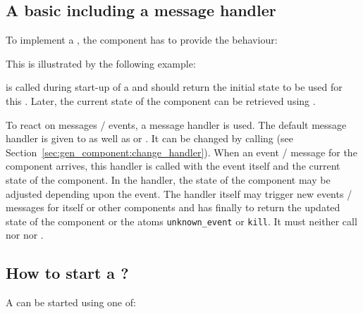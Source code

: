 \subsection{\texorpdfstring{A basic  including a message handler}
             {A basic gen\_component including a message handler}}

To implement a , the component has to provide the
 behaviour:


This is illustrated by the following example:


 is called during start-up of a
 and should return the initial state to be used
for this . Later, the current state of the
component can be retrieved using .

To react on messages / events, a message handler is used. The default
message handler is given to
 as well as
 or
. It can be
changed by calling  (see
Section~\ref{sec:gen_component:change_handler}). When an event / message for
the component arrives, this handler is called with the event itself and the
current state of the component. In the handler, the state of the component
may be adjusted depending upon the event. The handler itself may trigger new
events / messages for itself or other components and has finally to return
the updated state of the component or the atoms \texttt{unknown\_event} or
\texttt{kill}. It must neither call  nor
 nor .

\subsection{\texorpdfstring{How to start a ?}
             {How to start a gen\_component?}}

A  can be started using one of:

